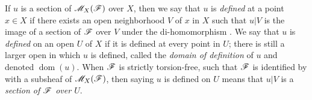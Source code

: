 \begin{env}[20.1.7]
\label{IV.20.1.7}
If $u$ is a section of $\mathscr{M}_X(\mathscr{F})$ over $X$, then we say that $u$ is \emph{defined} at a point $x\in X$ if there exists an open neighborhood $V$ of $x$ in $X$ such that $u|V$ is the image of a section of $\mathscr{F}$ over $V$ under the di-homomorphism .
We say that $u$ is \emph{defined} on an open $U$ of $X$ if it is defined at every point in $U$;
there is still a larger open in which $u$ is defined, called the \emph{domain of definition} of $u$ and denoted $\operatorname{dom}(u)$.
When $\mathscr{F}$ is strictly torsion-free, such that $\mathscr{F}$ is identified by  with a subsheaf of $\mathscr{M}_X(\mathscr{F})$, then saying $u$ is defined on $U$ means that $u|V$ is a \emph{section of $\mathscr{F}$ over $U$}.
\end{env}


